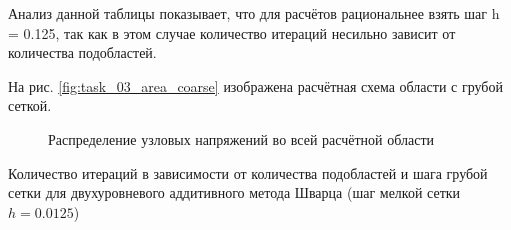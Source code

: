 \documentclass[a4paper]{article}
\begin{document}
Анализ данной таблицы показывает, что для расчётов рациональнее взять шаг h = 0.125, так как в этом случае количество итераций несильно зависит от количества подобластей.

На рис. \ref{fig:task_03_area_coarse} изображена расчётная схема области с грубой сеткой.

\begin{figure}[h]
\caption{Распределение узловых напряжений во всей расчётной области}
\label{fig:task_04_area_coarse}
\end{figure}

\newpage

\begin{table}[h]
\caption{Количество итераций в зависимости от количества подобластей и шага грубой сетки для двухуровневого аддитивного метода Шварца (шаг мелкой сетки $h = 0.0125$)}
\label{table:task_04_add2_coarse}
\end{table}
\end{document}
